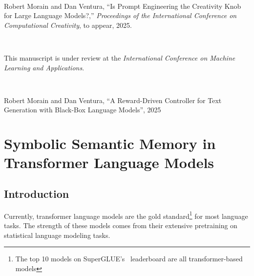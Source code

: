 \documentclass[phd,electronic,oneside,twosidetoc,letterpaper,chaptercenter,parttop,lof]{byumsphd}
\begin{document}
\

\noindent
Robert Morain and Dan Ventura, ``Is Prompt Engineering the Creativity Knob for Large Language Models?,'' \textit{Proceedings of the International Conference on Computational Creativity}, to appear, 2025. 

\

This manuscript is under review at the \textit{International Conference on Machine Learning and Applications}.  

\

\noindent
Robert Morain and Dan Ventura, ``A Reward-Driven Controller for Text Generation with Black-Box Language Models'', 2025


\chapter{Symbolic Semantic Memory in Transformer Language Models} 
\label{chap:ssm}


\newcommand{\LMLossPercentageDecrease}{81.04\%}


\begin{abstract}
This paper demonstrates how transformer language models can be improved by giving them access to relevant structured data extracted from a knowledge base. 
The methods for doing so include identifying entities in a text corpus, sorting the entities using a novel attention-based approach, linking entities to a knowledge base, then extracting and filtering the knowledge to create a knowledge-augmented dataset.
We evaluate these methods with the WikiText-103 corpus using standard language modeling objectives.
These results show that even simple additional knowledge augmentation leads to a reduction in validation perplexity by \LMLossPercentageDecrease. 
These methods also significantly outperform common ways of improving language models such as increasing the model size or adding more data.
\end{abstract}


\section{Introduction}
Currently, transformer language models are the gold standard\footnote{The top 10 models on SuperGLUE's~\cite{wang2019superglue} leaderboard are all transformer-based models} for most language tasks.
The strength of these models comes from their extensive pretraining on statistical language modeling tasks.
\end{document}
